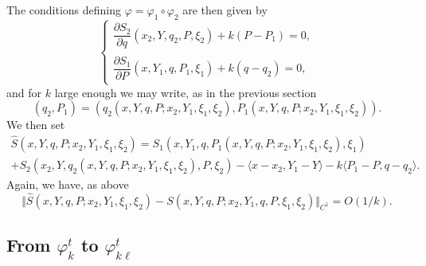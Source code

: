 \documentclass[JEP,XML,SOM,NoFloatCountersInSection,Unicode,published]{cedram}
\numberwithin{equation}{section}
\theoremstyle{plain}
\theoremstyle{definition}
\theoremstyle{remark}
\begin{document}
The conditions defining $\varphi=\varphi_1\circ \varphi_2$ are then given by
\[
\begin{cases}
\dfrac{\partial S_{2}}{\partial q_{}}(x_{2},Y,q_{2},P,\xi_{2})+k(P-P_{1})=0, \\[8pt]
\dfrac{\partial S_{1}}{\partial P_{}}(x,Y_{1},q,P_{1}, \xi_{1})+k (q-q_{2})=0,
\end{cases}
\]
and for $k$ large enough we may write, as in the previous section
\[
(q_2,P_1)= (q_2(x,Y,q,P; x_2,Y_1,\xi_{1},\xi_{2}), P_1(x,Y,q,P; x_2,Y_1,\xi_{1},\xi_{2})).
\]
We then set
\begin{multline*}
\widehat S(x,Y,q,P; x_2,Y_1,\xi_{1},\xi_{2})= S_{1}(x,Y_{1},q,P_{1}(x,Y,q,P; x_2,Y_1,\xi_{1},\xi_{2}),\xi_{1})\\
+S_{2}(x_{2},Y,q_{2}(x,Y,q,P; x_2,Y_1,\xi_{1},\xi_{2}),P,\xi_{2})-
\langle x-x_{2},Y_{1}-Y \rangle - k \langle P_{1}-P,q-q_{2} \rangle.
\end{multline*}
Again, we have, as above
\[
\Vert \widehat S(x,Y,q,P; x_2,Y_1,\xi_{1},\xi_{2})-S(x,Y,q,P;x_{2},Y_{1},q,P,\xi_{1},\xi_{2}) \Vert _{C^1}=O(1/k).
\]

\subsection{From \texorpdfstring{$\varphi_k^t$}{phikt} to \texorpdfstring{$\varphi_{k\ell}^t$}{phikellt}}
\end{document}
